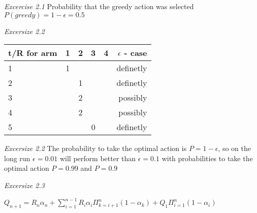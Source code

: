 \documentclass{article}
\begin{document}
\textit{Excercise 2.1} Probability that the greedy action was selected ${P(greedy) = 1 - \epsilon = 0.5}$

\textit{Excersize 2.2}

\begin{center}
\begin{tabular}{ l | c | c | c | c | r }
  t/R for arm & 1 & 2 & 3 & 4 & ${\epsilon}$ - case\\ \hline
      1       & 1 &   &   &   & definetly \\
      2       &   & 1 &   &   & definetly \\
      3       &   & 2 &   &   & possibly \\
      4       &   & 2 &   &   & possibly \\
      5       &   &   & 0 &   & definetly 
\end{tabular}
\end{center}

\textit{Excersize 2.2} The probability to take the optimal action is ${P = 1 - \epsilon}$, so on the long run ${\epsilon = 0.01}$ will perform better than ${\epsilon = 0.1}$ with probabilities to take the optimal action ${P=0.99}$ and ${P=0.9}$

\textit{Excersize 2.3}

\begin{math}
Q_{n+1} = R_n\alpha_n + \sum_{i=1}^{n-1}R_i\alpha_i\Pi_{k=i+1}^{n}(1-\alpha_k) + Q_1 \Pi_{i=1}^{n}(1-\alpha_i)
\end{math}
\end{document}
